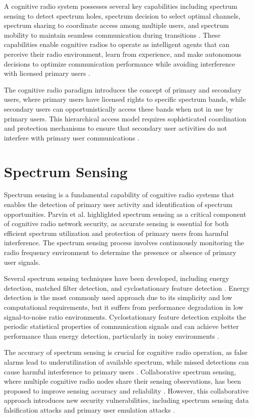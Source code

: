 A cognitive radio system possesses several key capabilities including spectrum sensing to detect spectrum holes, spectrum decision to select optimal channels, spectrum sharing to coordinate access among multiple users, and spectrum mobility to maintain seamless communication during transitions \cite{ref3,ref25}. These capabilities enable cognitive radios to operate as intelligent agents that can perceive their radio environment, learn from experience, and make autonomous decisions to optimize communication performance while avoiding interference with licensed primary users \cite{ref2}.

The cognitive radio paradigm introduces the concept of primary and secondary users, where primary users have licensed rights to specific spectrum bands, while secondary users can opportunistically access these bands when not in use by primary users. This hierarchical access model requires sophisticated coordination and protection mechanisms to ensure that secondary user activities do not interfere with primary user communications \cite{ref3,ref7}.

\section{\textbf{Spectrum Sensing}}

Spectrum sensing is a fundamental capability of cognitive radio systems that enables the detection of primary user activity and identification of spectrum opportunities. Parvin et al. \cite{ref25} highlighted spectrum sensing as a critical component of cognitive radio network security, as accurate sensing is essential for both efficient spectrum utilization and protection of primary users from harmful interference. The spectrum sensing process involves continuously monitoring the radio frequency environment to determine the presence or absence of primary user signals.

Several spectrum sensing techniques have been developed, including energy detection, matched filter detection, and cyclostationary feature detection \cite{ref1,ref11}. Energy detection is the most commonly used approach due to its simplicity and low computational requirements, but it suffers from performance degradation in low signal-to-noise ratio environments. Cyclostationary feature detection exploits the periodic statistical properties of communication signals and can achieve better performance than energy detection, particularly in noisy environments \cite{ref11}.

The accuracy of spectrum sensing is crucial for cognitive radio operation, as false alarms lead to underutilization of available spectrum, while missed detections can cause harmful interference to primary users \cite{ref1,ref4}. Collaborative spectrum sensing, where multiple cognitive radio nodes share their sensing observations, has been proposed to improve sensing accuracy and reliability \cite{ref8}. However, this collaborative approach introduces new security vulnerabilities, including spectrum sensing data falsification attacks and primary user emulation attacks \cite{ref7,ref14}.

